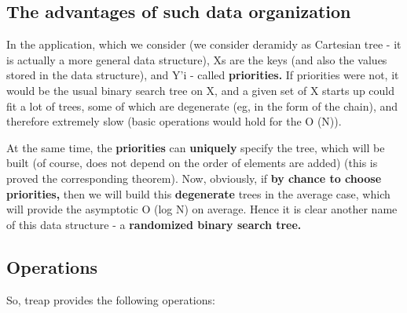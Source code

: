 \subsection{ The advantages of such data organization }
In the application, which we consider (we consider deramidy as Cartesian tree - it is actually a more general data structure), Xs are the keys (and also the values ​​stored in the data structure), and Y'i - called \textbf{priorities.} If priorities were not, it would be the usual binary search tree on X, and a given set of X starts up could fit a lot of trees, some of which are degenerate (eg, in the form of the chain), and therefore extremely slow (basic operations would hold for the O (N)).

At the same time, the \textbf{priorities} can \textbf{uniquely} specify the tree, which will be built (of course, does not depend on the order of elements are added) (this is proved the corresponding theorem). Now, obviously, if \textbf{by chance to choose priorities,} then we will build this \textbf{degenerate} trees in the average case, which will provide the asymptotic O (log N) on average. Hence it is clear another name of this data structure - a \textbf{randomized binary search tree.}

\subsection{ Operations }
So, treap provides the following operations:

